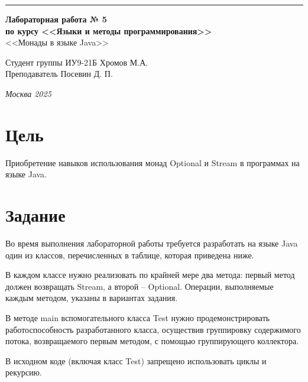 \documentclass[a4paper, 14pt]{extarticle}
\begin{document}
\begin{titlepage}
\vspace*{-16pt}
\hspace{30pt}\rule{0.866\textwidth}{0.4pt}
  
\vspace{11em}

\begin{center}
\Large {\bf Лабораторная работа № 5} \\ 
\large {\bf по курсу <<Языки и методы программирования>>} \\ 
\large <<Монады в языке Java>>
\end{center}\normalsize

\vspace{8em}


\begin{flushright}
  {Студент группы ИУ9-21Б Хромов М.А.\hspace*{15pt} \\
  \vspace{2ex}
  Преподаватель Посевин Д. П.\hspace*{15pt}}
\end{flushright}

\bigskip

\vfill
 

\begin{center}
\textsl{Москва 2025}
\end{center}
\end{titlepage}

\renewcommand{\ttdefault}{pcr}

\setlength{\tabcolsep}{3pt}
\newpage
\section{Цель}\label{Sect::task}
\par
Приобретение навыков использования монад Optional и Stream в программах на языке Java. 


\section{Задание}\label{Sect::task}
\par
Во время выполнения лабораторной работы требуется разработать на языке Java один из классов, перечисленных в таблице, которая приведена ниже.
\par
В каждом классе нужно реализовать по крайней мере два метода: первый метод должен возвращать Stream, а второй – Optional. Операции, выполняемые каждым методом, указаны в вариантах задания. 
\par
В методе main вспомогательного класса Test нужно продемонстрировать работоспособность разработанного класса, осуществив группировку содержимого потока, возвращаемого первым методом, с помощью группирующего коллектора. 
\par
В исходном коде (включая класс Test) запрещено использовать циклы и рекурсию.  
\end{document}
